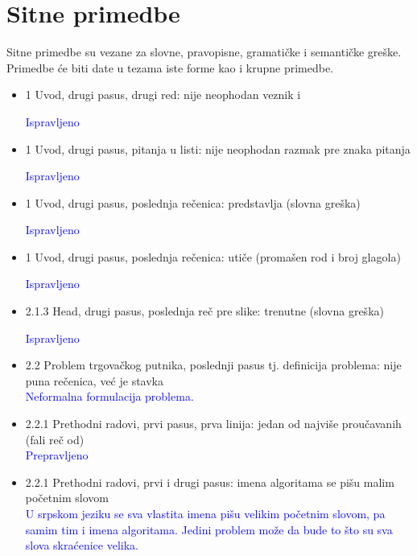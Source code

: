 \documentclass[a4paper]{report}
\newcommand{\odgovor}[1]{\textcolor{blue}{#1}}
\begin{document}
\section{Sitne primedbe}
Sitne primedbe su vezane za slovne, pravopisne, gramatičke i semantičke greške. Primedbe će biti date u tezama iste forme kao i krupne primedbe.
\begin{itemize}
    \item 1 Uvod, drugi pasus, drugi red: nije neophodan veznik i
        
    \odgovor{Ispravljeno}
        
    \item 1 Uvod, drugi pasus, pitanja u listi: nije neophodan razmak pre znaka pitanja
    
    \odgovor{Ispravljeno}
        
    \item 1 Uvod, drugi pasus, poslednja rečenica: predstavlja (slovna greška)
    
    \odgovor{Ispravljeno}
    
    \item 1 Uvod, drugi pasus, poslednja rečenica: utiče (promašen rod i broj glagola)
    
    \odgovor{Ispravljeno}
    
    \item 2.1.3 Head, drugi pasus, poslednja reč pre slike: trenutne (slovna greška)
    
    \odgovor{Ispravljeno}
    
    \item 2.2 Problem trgovačkog putnika, poslednji pasus tj. definicija problema: nije puna rečenica, već je stavka \\
    \odgovor {Neformalna formulacija problema.}
    
    \item 2.2.1 Prethodni radovi, prvi pasus, prva linija: jedan od najviše proučavanih (fali reč od)\\
    \odgovor{ Prepravljeno}
    
    \item 2.2.1 Prethodni radovi, prvi i drugi pasus: imena algoritama se pišu malim početnim slovom\\
    \odgovor{ U srpskom jeziku se sva vlastita imena pišu velikim početnim slovom, pa samim tim i imena algoritama. Jedini problem može da bude to što su sva slova skraćenice velika.}
    

\end{itemize}
\end{document}
